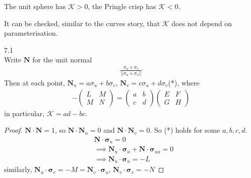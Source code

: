\documentclass[a4paper]{article}
\begin{document}
\begin{eg}
The unit sphere has $\mathcal{K}>0$, the Pringle crisp has $\mathcal{K}<0$.
\end{eg}

\begin{rem}
It can be checked, similar to the curves story, that $\mathcal{K}$ does not depend on parameterisation.
\end{rem}

\begin{prop} 7.1\\
Write $\mathbf{N}$ for the unit normal
\begin{equation*}
\begin{aligned}
\frac{\sigma_u \times \sigma_v}{||\sigma_u \times \sigma_v||}
\end{aligned}
\end{equation*}
Then at each point, $\mathbf{N}_u = a \sigma_u + b\sigma_v$, $\mathbf{N}_v = c\sigma_u + d\sigma_v$(*), where
\begin{equation*}\tag{**}
\begin{aligned}
-\left(\begin{matrix}
L & M\\
M & N
\end{matrix}\right) = \left(\begin{matrix}
a & b\\
c & d
\end{matrix}\right) \left(\begin{matrix}
E & F\\
G & H
\end{matrix}\right)
\end{aligned}
\end{equation*}
in particular, $\mathcal{K} = ad-bc$.
\begin{proof}
$\mathbf{N} \cdot \mathbf{N}=1$, so $\mathbf{N} \cdot \mathbf{N}_u = 0$ and $\mathbf{N} \cdot \mathbf{N}_v=0$. So (*) holds for some $a,b,c,d$.
\begin{equation*}
\begin{aligned}
&\mathbf{N} \cdot \mathbf{\sigma}_u = 0 \\&\implies \mathbf{N}_u \cdot \mathbf{\sigma}_u + \mathbf{N} \cdot \mathbf{\sigma}_{uu} = 0 \\
&\implies \mathbf{N}_u \cdot \mathbf{\sigma}_u = -L
\end{aligned}
\end{equation*}
similarly, $\mathbf{N}_u \cdot \mathbf{\sigma}_v = -M = \mathbf{N}_v \cdot \mathbf{\sigma}_u$, $\mathbf{N}_v \cdot \mathbf{\sigma}_v = -N$

\end{proof}
\end{prop}
\end{document}

